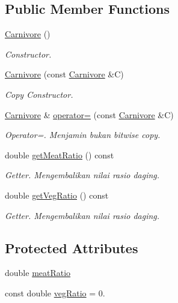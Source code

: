 \subsection*{Public Member Functions}
\begin{DoxyCompactItemize}
\item 
\hyperlink{classCarnivore_ac18446eeb7acb1dfd3a9c9c955e61ed7}{Carnivore} ()
\begin{DoxyCompactList}\small\item\em Constructor. \end{DoxyCompactList}\item 
\hyperlink{classCarnivore_a32e0695adddbfba360487e31e0653204}{Carnivore} (const \hyperlink{classCarnivore}{Carnivore} \&C)
\begin{DoxyCompactList}\small\item\em Copy Constructor. \end{DoxyCompactList}\item 
\hyperlink{classCarnivore}{Carnivore} \& \hyperlink{classCarnivore_a1f219198f593592d526ba3302d8449f9}{operator=} (const \hyperlink{classCarnivore}{Carnivore} \&C)
\begin{DoxyCompactList}\small\item\em Operator=. Menjamin bukan bitwise copy. \end{DoxyCompactList}\item 
double \hyperlink{classCarnivore_a7d439e225f7cfaf0386c3b1aee77762b}{get\+Meat\+Ratio} () const 
\begin{DoxyCompactList}\small\item\em Getter. Mengembalikan nilai rasio daging. \end{DoxyCompactList}\item 
double \hyperlink{classCarnivore_a74738f03db5bbe83281ada638580dc36}{get\+Veg\+Ratio} () const 
\begin{DoxyCompactList}\small\item\em Getter. Mengembalikan nilai rasio daging. \end{DoxyCompactList}\end{DoxyCompactItemize}
\subsection*{Protected Attributes}
\begin{DoxyCompactItemize}
\item 
double \hyperlink{classCarnivore_a7fded43c2f22eab35e2e6f16ae155f27}{meat\+Ratio}
\item 
const double \hyperlink{classCarnivore_ab4047f87dae34ec4667f42e1efd57d93}{veg\+Ratio} = 0.
\end{DoxyCompactItemize}



